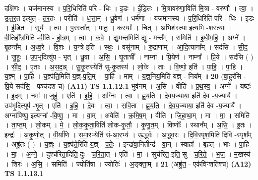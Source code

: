 \documentclass[17pt]{extarticle}
\begin{document}
                  दक्षि॑णः । यज॑मानस्य । प॒रि॒धिरिति॑ परि - धिः । इ॒डः । ई॒डि॒तः । मि॒त्रावरु॑णा॒विति॑ मि॒त्रा - वरु॑णौ । त्वा॒ । उ॒त्त॒र॒त इत्यु॑त् - त॒र॒तः । परीति॑ । ध॒त्ता॒म् । ध्रु॒वेण॑ । धर्म॑णा । यज॑मानस्य । प॒रि॒धिरिति॑ परि - धिः । इ॒डः । ई॒डि॒तः । सूर्यः॑ । त्वा॒ । पु॒रस्ता᳚त् । पा॒तु॒ । कस्याः᳚ । चि॒त् । अ॒भिश॑स्त्या॒ इत्य॒भि -श॒स्त्याः॒ । वी॒तिहो᳚त्र॒मिति॑ -वी॒ति - हो॒त्र॒म् । त्वा॒ । क॒वे॒ । द्यु॒मन्त॒मिति॑ द्यु - मन्त᳚म् । समिति॑ । इ॒धी॒म॒हि॒ । अग्ने᳚ । बृ॒हन्त᳚म् । अ॒ध्व॒रे । वि॒शः । य॒न्त्रे इति॑ । स्थः॒ । वसू॑नाम् । रु॒द्राणा᳚म् । आ॒दि॒त्याना᳚म् । सद॑सि । सी॒द॒ । जु॒हूः । उ॒प॒भृदित्यु॑प - भृत् । ध्रु॒वा । अ॒सि॒ । घृ॒ताची᳚ । नाम्ना᳚ । प्रि॒येण॑ । नाम्ना᳚ । प्रि॒ये । सद॑सि ( ) । सी॒द॒ । ए॒ताः । अ॒स॒द॒न्न् । सु॒कृ॒तस्येति॑ सु-कृ॒तस्य॑ । लो॒के । ताः । वि॒ष्णो॒ इति॑ । पा॒हि॒ । पा॒हि । य॒ज्ञ्म् । पा॒हि । य॒ज्ञ्प॑ति॒मिति॑ य॒ज्ञ्-प॒ति॒म् । पा॒हि । माम् । य॒ज्ञ्॒निय॒मिति॑ यज्ञ् - निय᳚म् ॥ \textbf{  20} \newline
                  \newline
                      (बा॒हुर॑सि - प्रि॒ये सद॑सि॒ - पञ्च॑दश च)  \textbf{(A11)} \newline \newline
                                \textbf{ TS 1.1.12.1} \newline
                  भुव॑नम् । अ॒सि॑ । वीति॑ । प्र॒थ॒स्व॒ । अग्ने᳚ । यष्टः॑ । इ॒दम् । नमः॑ ॥ जुहु॑ । एति॑ । इ॒हि॒ । अ॒ग्निः । त्वा॒ । ह्व॒य॒ति॒ । दे॒व॒य॒ज्याया॒ इति॑ देव -य॒ज्यायै᳚ । उप॑भृ॒दित्युप॑ -भृ॒त् । एति॑ । इ॒हि॒ । दे॒वः । त्वा॒ । स॒वि॒ता । ह्व॒य॒ति॒ । दे॒व॒य॒ज्याया॒ इति॑ देव -य॒ज्यायै᳚ । अग्ना॑विष्णू॒ इत्यग्ना᳚ -वि॒ष्णू॒ । मा । वा॒म् । अवेति॑ । क्र॒मि॒ष॒म् । वीति॑ । जि॒हा॒था॒म् । मा । मा॒ । समिति॑ । ता॒प्त॒म् । लो॒कम् । मे॒ । लो॒क॒कृ॒ता॒विति॑ लोक-कृ॒तौ॒ । कृ॒णु॒त॒म् । विष्णोः᳚ । स्थान᳚म् । अ॒सि॒ । इ॒तः । इन्द्रः॑ । अ॒कृ॒णो॒त् । वी॒र्या॑णि । स॒मा॒रभ्येति॑ सं-आ॒रभ्य॑ । ऊ॒र्द्ध्वः । अ॒द्ध्व॒रः । दि॒वि॒स्पृश॒मिति॑ दिवि -स्पृश᳚म् । अह्रु॑तः ( ) । य॒ज्ञ्ः । य॒ज्ञ्प॑ते॒रिति॑ य॒ज्ञ् - प॒तेः॒ । इन्द्रा॑वा॒नितीन्द्र॑ - वा॒न् । स्वाहा᳚ । बृ॒हत् । भाः । पा॒हि । मा॒ । अ॒ग्ने॒ । दुश्च॑रिता॒दिति॒ दुः - च॒रि॒ता॒त् । एति॑ । मा॒ । सुच॑रित॒ इति॒ सु - च॒रि॒ते॒ । भ॒ज॒ । म॒खस्य॑ । शिरः॑ । अ॒सि॒ । समिति॑ । ज्योति॑षा । ज्योतिः॑ । अ॒ङ्क्ता॒म् ॥ \textbf{  21 } \newline
                  \newline
                      (अह्रु॑त॒ - एक॑विꣳशतिश्च)  \textbf{(A12)} \newline \newline
                                \textbf{ TS 1.1.13.1} \newline
\end{document}
